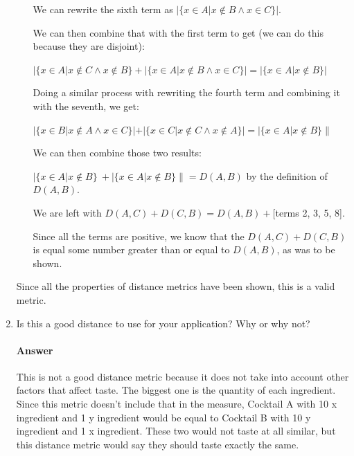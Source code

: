 \documentclass{article}
\begin{document}
\begin{enumerate}
\begin{enumerate}
       We can rewrite the sixth term as $|\{x \in A| x \notin B\land x \in C\}|$.
       
       We can then combine that with the first term to get (we can do this because they are disjoint):
       
       $|\{x \in A | x \notin C \land x \notin B \} + |\{x \in A| x \notin B\land x \in C\}| = |\{x \in A| x \notin B\}|$
       
       Doing a similar process with rewriting the fourth term and combining it with the seventh, we get:
       
       $|\{x \in B | x \notin A \land x \in C \}| + |\{x \in C | x \notin C \land x \notin A \}| = |\{x \in A| x \notin B\}\|$
       
       We can then combine those two results:
       
       $|\{x \in A| x \notin B\}\ + |\{x \in A| x \notin B\}\| = D(A,B)$ by the definition of $D(A,B)$.
       
       We are left with $D(A,C) + D(C,B) = D(A,B) + $[terms 2, 3, 5, 8].
       
       Since all the terms are positive, we know that the $D(A,C) + D(C,B)$ is equal some number greater than or equal to $D(A,B)$, as was to be shown.
       \end{enumerate}
       
       Since all the properties of distance metrics have been shown, this is a valid metric.
        
    \item Is this a good distance to use for your application?  Why or why not?

        \paragraph{Answer}

        This is not a good distance metric because it does not take into account other factors that affect taste. The biggest one is the quantity of each ingredient. 
        Since this metric doesn't include that in the measure, Cocktail A with 10 x ingredient and 1 y ingredient would be equal to Cocktail B with 10 y ingredient and 1 x ingredient. These two would not taste at all similar, 
        but this distance metric would say they should taste exactly the same.

\end{enumerate}


 
\end{document}
